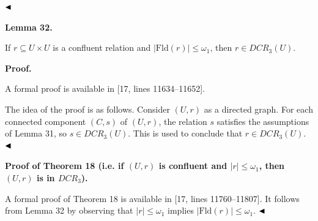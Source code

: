  
  
$\hfill\blacktriangleleft$\par
 
 
 
\par\medskip\noindent\textbf{Lemma 32.}\par
 
 
If $r\subseteq U\times U$ is a confluent relation and $|\mathrm{Fld}(r)|\leq\omega_{1}$, then $r\in DCR_{3}(U)$.\par
 
 
 
 
 
\par\medskip\noindent\textbf{Proof.}\par
 
 
A formal proof is available in [17, lines 11634–11652].\par
 
 
 
The idea of the proof is as follows. Consider $(U,r)$ as a directed graph. For each connected component $(C,s)$ of $(U,r)$, the relation $s$ satisfies the assumptions of Lemma 31, so $s\in DCR_{3}(U)$. This is used to conclude that $r\in DCR_{3}(U)$. $\hfill\blacktriangleleft$\par
 
 
 
 
\par\medskip\noindent\textbf{Proof of Theorem 18 (i.e. if $(U,r)$ is confluent and $|r|\leq\omega_{1}$, then $(U,r)$ is in $DCR_{3}$).}\par
 
 
A formal proof of Theorem 18 is available in [17, lines 11760–11807]. It follows from Lemma 32 by observing that $|r|\leq\omega_{1}$ implies $|\mathrm{Fld}(r)|\leq\omega_{1}$. $\hfill\blacktriangleleft$\par
 
